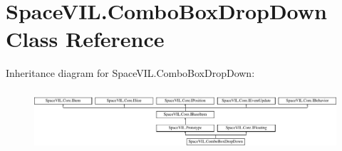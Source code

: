 \hypertarget{class_space_v_i_l_1_1_combo_box_drop_down}{}\section{Space\+V\+I\+L.\+Combo\+Box\+Drop\+Down Class Reference}
\label{class_space_v_i_l_1_1_combo_box_drop_down}
Inheritance diagram for Space\+V\+I\+L.\+Combo\+Box\+Drop\+Down\+:\begin{figure}[H]
\begin{center}
\leavevmode
\includegraphics[height=2.251256cm]{class_space_v_i_l_1_1_combo_box_drop_down}
\end{center}
\end{figure}
